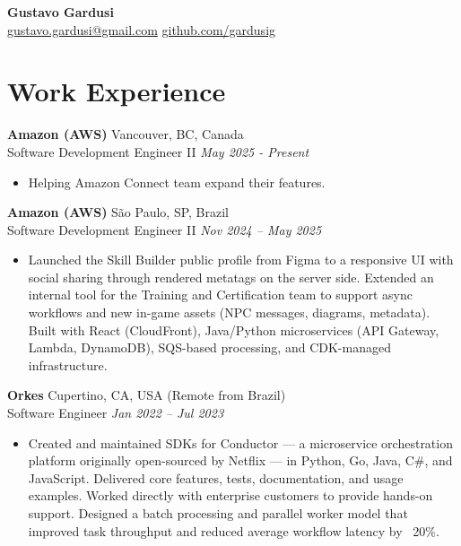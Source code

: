 \documentclass[a4paper,10pt]{article}
\begin{document}
\begin{center}
    {\LARGE \textbf{Gustavo Gardusi}} \\ \vspace{0.5em}
    \href{mailto:gustavo.gardusi@gmail.com}{gustavo.gardusi@gmail.com} \textbar \href{https://github.com/gardusig}{github.com/gardusig}
\end{center}

\section*{Work Experience}

\textbf{Amazon (AWS)}
    \hfill Vancouver, BC, Canada
    \\ Software Development Engineer II 
    \hfill \textit{May 2025 - Present}
\begin{itemize}
    \item Helping Amazon Connect team expand their features.
\end{itemize}

\textbf{Amazon (AWS)}
    \hfill São Paulo, SP, Brazil 
    \\ Software Development Engineer II 
    \hfill \textit{Nov 2024 – May 2025}
\begin{itemize}
    \item Launched the Skill Builder public profile from Figma to a responsive UI with social sharing through rendered metatags on the server side. Extended an internal tool for the Training and Certification team to support async workflows and new in-game assets (NPC messages, diagrams, metadata). Built with React (CloudFront), Java/Python microservices (API Gateway, Lambda, DynamoDB), SQS-based processing, and CDK-managed infrastructure.
\end{itemize}

\textbf{Orkes}
    \hfill Cupertino, CA, USA (Remote from Brazil)
    \\ Software Engineer
    \hfill \textit{Jan 2022 – Jul 2023}
\begin{itemize}
    \item Created and maintained SDKs for Conductor — a microservice orchestration platform originally open-sourced by Netflix — in Python, Go, Java, C\#, and JavaScript. Delivered core features, tests, documentation, and usage examples. Worked directly with enterprise customers to provide hands-on support. Designed a batch processing and parallel worker model that improved task throughput and reduced average workflow latency by ~20\%.
\end{itemize}
\end{document}
